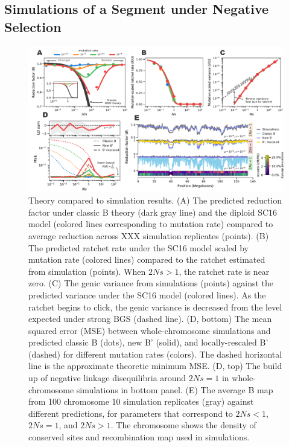 \documentclass[11pt]{article}
\begin{document}
\subsection*{Simulations of a Segment under Negative Selection}

\begin{figure}[htbp] \centering
    \includegraphics[width=\textwidth]{figures/figure_1.pdf} \caption{Theory
        compared to simulation results. (A) The predicted reduction factor
        under classic B theory (dark gray line) and the diploid SC16 model
        (colored lines corresponding to mutation rate) compared to average
        reduction across XXX simulation replicates (points). (B) The predicted
        ratchet rate under the SC16 model scaled by mutation rate (colored
        lines) compared to the ratchet estimated from simulation (points). When
        $2Ns>1$, the ratchet rate is near zero. (C) The genic variance from
        simulations (points) against the predicted variance under the SC16
        model (colored lines). As the ratchet begins to click, the genic
        variance is decreased from the level expected under strong BGS (dashed
        line). (D, bottom) The mean squared error (MSE) between
        whole-chromosome simulations and predicted classic B (dots), new B'
        (solid), and locally-rescaled B' (dashed) for different mutation rates
        (colors). The dashed horizontal line is the approximate theoretic
        minimum MSE. (D, top) The build up of negative linkage disequilibria
        around $2Ns=1$ in whole-chromosome simulations in bottom panel. (E) The
        average B map from 100 chromosome 10 simulation replicates (gray)
    against different predictions, for parameters that correspond to $2Ns < 1$,
$2Ns = 1$, and $2Ns > 1$. The chromosome shows the density of conserved sites
and recombination map used in simulations. }
  \label{fig:figure-1}
\end{figure}
\end{document}
